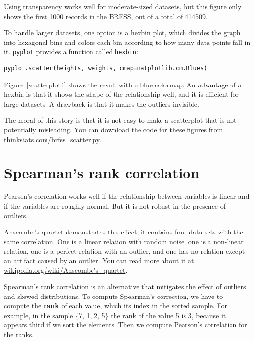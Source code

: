 \documentclass[12pt]{book}
\begin{document}
Using transparency works well for moderate-sized datasets, but this
figure only shows the first 1000 records in the BRFSS, out of a total
of 414509.

To handle larger datasets, one option is a hexbin plot, which divides
the graph into hexagonal bins and colors each bin according to how many
data points fall in it.  {\tt pyplot} provides a function called 
{\tt hexbin}:
%
\begin{verbatim}
pyplot.scatter(heights, weights, cmap=matplotlib.cm.Blues)
\end{verbatim}
%
Figure~\ref{scatterplot4} shows the result with a blue colormap.
An advantage of a hexbin is that it shows the shape of the relationship
well, and it is efficient for large datasets.  A drawback is that
it makes the outliers invisible.

The moral of this story is that it is
not easy to make a scatterplot that is not potentially misleading.
You can download the code for these figures from
\url{thinkstats.com/brfss_scatter.py}.

\section{Spearman's rank correlation}

Pearson's correlation works well if the relationship between variables
is linear and if the variables are roughly normal.  But it is not
robust in the presence of outliers.

Anscombe's quartet demonstrates this effect; it contains four data
sets with the same correlation.  One is a linear relation with random
noise, one is a non-linear relation, one is a perfect relation with an
outlier, and one has no relation except an artifact caused by an
outlier.  You can read more about it at
\url{wikipedia.org/wiki/Anscombe's_quartet}.

Spearman's rank correlation is an alternative that mitigates the
effect of outliers and skewed distributions.  To compute Spearman's
correction, we have to compute the {\bf rank} of each value, which its
index in the sorted sample.  For example, in the sample \{7, 1, 2, 5\}
the rank of the value 5 is 3, because it appears third if we sort
the elements.  Then we compute Pearson's correlation for the ranks.
\end{document}
